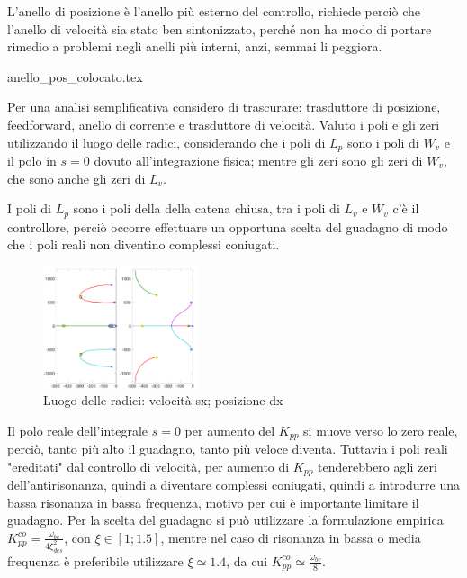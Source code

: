 L'anello di posizione è l'anello più esterno del controllo, richiede perciò che l'anello di velocità sia stato ben sintonizzato, perché non ha modo di portare rimedio a problemi negli anelli più interni, anzi, semmai li peggiora.


{anello_pos_colocato.tex}

Per una analisi semplificativa considero di trascurare: trasduttore di posizione, feedforward, anello di corrente e trasduttore di velocità.
Valuto i poli e gli zeri utilizzando il luogo delle radici, considerando che i poli di \(L_p\) sono i poli di \(W_v\) e il polo in \(s=0\) dovuto all'integrazione fisica; mentre gli zeri sono gli zeri di \(W_v\), che sono anche gli zeri di \(L_v\).

I poli di \(L_p\) sono i poli della della catena chiusa, tra i poli di \(L_v\) e \(W_v\) c'è il controllore, perciò occorre effettuare un opportuna scelta del guadagno di modo che i poli reali non diventino complessi coniugati.

\begin{figure}[h]
    \centering
    \includegraphics[width=0.4\textwidth]{Immagini/luogo_radici_colocato_vel_vs_pos.png}
    \caption{Luogo delle radici: velocità sx; posizione dx}
\end{figure}

Il polo reale dell'integrale \(s=0\) per aumento del \(K_{pp}\) si muove verso lo zero reale, perciò, tanto più alto il guadagno, tanto più veloce diventa.
Tuttavia i poli reali "ereditati" dal controllo di velocità, per aumento di \(K_{pp}\) tenderebbero agli zeri dell'antirisonanza, quindi a diventare complessi coniugati, quindi a introdurre una bassa risonanza in bassa frequenza, motivo per cui è importante limitare il guadagno.
Per la scelta del guadagno si può utilizzare la formulazione empirica \(K_{pp}^{co} = \frac{\omega_{bv}}{4\xi_{des}^2}\), con \(\xi\in [1;1.5]\), mentre nel caso di risonanza in bassa o media frequenza è preferibile utilizzare \(\xi \simeq 1.4\), da cui \(K_{pp}^{co}\simeq \frac{\omega_{bv}}{8}\).

